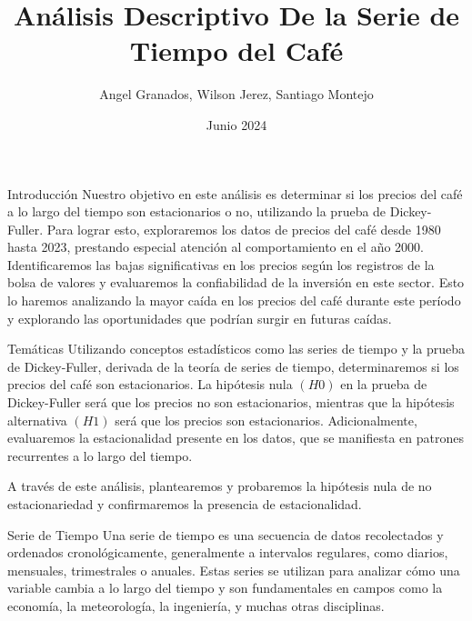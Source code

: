 \documentclass[
  10pt,
  ignorenonframetext,
  aspectratio=1612]{beamer}
\title{Análisis Descriptivo De la Serie de Tiempo del Café}
\author{Angel Granados, Wilson Jerez, Santiago Montejo}
\date{Junio 2024}
\begin{document}
\frame{\titlepage}

\begin{frame}{Introducción}
\label{introducciuxf3n}
Nuestro objetivo en este análisis es determinar si los precios del café
a lo largo del tiempo son estacionarios o no, utilizando la prueba de
Dickey-Fuller. Para lograr esto, exploraremos los datos de precios del
café desde 1980 hasta 2023, prestando especial atención al
comportamiento en el año 2000. Identificaremos las bajas significativas
en los precios según los registros de la bolsa de valores y evaluaremos
la confiabilidad de la inversión en este sector. Esto lo haremos
analizando la mayor caída en los precios del café durante este período y
explorando las oportunidades que podrían surgir en futuras caídas.
\end{frame}

\begin{frame}{Temáticas}
\label{temuxe1ticas}
Utilizando conceptos estadísticos como las series de tiempo y la prueba
de Dickey-Fuller, derivada de la teoría de series de tiempo,
determinaremos si los precios del café son estacionarios. La hipótesis
nula \((H0)\) en la prueba de Dickey-Fuller será que los precios no son
estacionarios, mientras que la hipótesis alternativa \((H1)\) será que
los precios son estacionarios. Adicionalmente, evaluaremos la
estacionalidad presente en los datos, que se manifiesta en patrones
recurrentes a lo largo del tiempo.

A través de este análisis, plantearemos y probaremos la hipótesis nula
de no estacionariedad y confirmaremos la presencia de estacionalidad.
\end{frame}

\begin{frame}{Serie de Tiempo}
\label{serie-de-tiempo}
Una serie de tiempo es una secuencia de datos recolectados y ordenados
cronológicamente, generalmente a intervalos regulares, como diarios,
mensuales, trimestrales o anuales. Estas series se utilizan para
analizar cómo una variable cambia a lo largo del tiempo y son
fundamentales en campos como la economía, la meteorología, la
ingeniería, y muchas otras disciplinas.
\end{frame}
\end{document}

